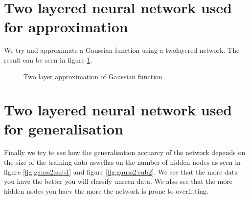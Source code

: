 \documentclass[a4paper,11pt]{article}
\begin{document}
\clearpage
\section{Two layered neural network used for approximation}
We try and approximate a Gaussian function using a twolayered network. The result can be seen in figure \ref{fig:gauss1}.

\begin{figure}[h!]
\label{fig:gauss1}
\caption{Two layer approximation of Gaussian function.}
\end{figure}

\clearpage
\section{Two layered neural network used for generalisation}
Finally we try to see how the generalisation accuarcy of the network depends on the size of the training data aswellas on the number of hidden nodes as seen in figure \ref{fig:gauss2:sub1} and figure \ref{fig:gauss2:sub2}. We see that the more data you have the better you will classify unseen data. We also see that the more hidden nodes you haev the more the network is prone to overfitting.
\end{document}
